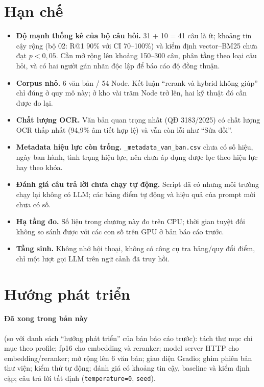 \section{Hạn chế}

\begin{itemize}
  \item \textbf{Độ mạnh thống kê của bộ câu hỏi.} 31 + 10 = 41 câu là ít; khoảng tin cậy rộng (bộ 02:
        R@1 90\% với CI 70--100\%) và kiểm định vector--BM25 chưa đạt $p<0{,}05$. Cần mở rộng lên
        khoảng 150--300 câu, phân tầng theo loại câu hỏi, và có hai người gán nhãn độc lập để báo cáo
        độ đồng thuận.
  \item \textbf{Corpus nhỏ.} 6 văn bản / 54 Node. Kết luận ``rerank và hybrid không giúp'' chỉ đúng ở
        quy mô này; ở kho vài trăm Node trở lên, hai kỹ thuật đó cần được đo lại.
  \item \textbf{Chất lượng OCR.} Văn bản quan trọng nhất (QĐ 3183/2025) có chất lượng OCR thấp nhất
        (94,9\% âm tiết hợp lệ) và vẫn còn lỗi như ``Sửa đồi''.
  \item \textbf{Metadata hiệu lực còn trống.} \texttt{\_metadata\_van\_ban.csv} chưa có số hiệu, ngày
        ban hành, tình trạng hiệu lực, nên chưa áp dụng được lọc theo hiệu lực hay theo khóa.
  \item \textbf{Đánh giá câu trả lời chưa chạy tự động.} Script đã có nhưng môi trường chạy lại không
        có LLM; các bảng điểm tự động và hiệu quả của prompt mới chưa có số.
  \item \textbf{Hạ tầng đo.} Số liệu trong chương này đo trên CPU; thời gian tuyệt đối không so sánh
        được với các con số trên GPU ở bản báo cáo trước.
  \item \textbf{Tầng sinh.} Không nhớ hội thoại, không có công cụ tra bảng/quy đổi điểm, chỉ một lượt
        gọi LLM trên ngữ cảnh đã truy hồi.
\end{itemize}


\section{Hướng phát triển}
\label{sec:huong-phat-trien}

\paragraph{Đã xong trong bản này} (so với danh sách ``hướng phát triển'' của bản báo cáo trước):
tách thư mục chỉ mục theo profile; fp16 cho embedding và reranker; model server HTTP cho
embedding/reranker; mở rộng lên 6 văn bản; giao diện Gradio; ghim phiên bản thư viện; kiểm thử tự
động; đánh giá có khoảng tin cậy, baseline và kiểm định cặp; câu trả lời tất định
(\texttt{temperature=0}, \texttt{seed}).

